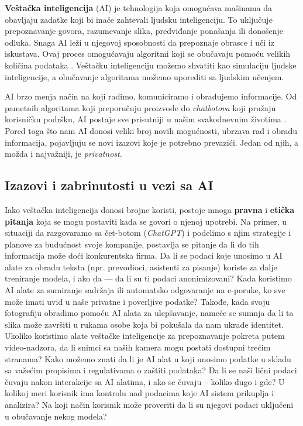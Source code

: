\documentclass[a4paper,12pt]{article}
\begin{document}
\textbf{Veštačka inteligencija} (AI) je tehnologija koja omogućava mašinama da obavljaju zadatke koji bi inače zahtevali ljudsku inteligenciju. To uključuje prepoznavanje govora, razumevanje slika, predviđanje ponašanja ili donošenje odluka. Snaga AI leži u njegovoj sposobnosti da prepoznaje obrasce i uči iz iskustava. Ovaj proces omogućavaju algoritmi koji se obučavaju pomoću velikih količina podataka \cite{whitevision_ai_privacy}. Veštačku inteligenciju možemo shvatiti kao simulaciju ljudske inteligencije, a obučavanje algoritama možemo uporediti sa ljudskim učenjem.

AI brzo menja način na koji radimo, komuniciramo i obrađujemo informacije. Od pametnih algoritama koji preporučuju proizvode do \textit{chatbotova} koji pružaju korisničku podršku, AI postaje sve prisutniji u našim svakodnevnim životima \cite{whitevision_ai_privacy}. Pored toga što nam AI donosi veliki broj novih mogućnosti, ubrzava rad i obradu informacija, pojavljuju se novi izazovi koje je potrebno prevazići. Jedan od njih, a možda i najvažniji, je \textit{privatnost}.

\subsection{Izazovi i zabrinutosti u vezi sa AI}


Iako veštačka inteligencija donosi brojne koristi, postoje mnoga \textbf{pravna} i \textbf{etička pitanja} koja se mogu postaviti kada se govori o njenoj upotrebi. Na primer, u situaciji da razgovaramo sa čet-botom (\textit{ChatGPT}) i podelimo s njim strategije i planove za budućnost svoje kompanije, postavlja se pitanje da li do tih informacija može doći konkurentska firma. Da li se podaci koje unosimo u AI alate za obradu teksta (npr. prevodioci, asistenti za pisanje) koriste za dalje treniranje modela, i ako da — da li su ti podaci anonimizovani? Kada koristimo AI alate za sumiranje sadržaja ili automatsko odgovaranje na e-poruke, ko sve može imati uvid u naše privatne i poverljive podatke? Takođe, kada svoju fotografiju obradimo pomoću AI alata za ulepšavanje, nameće se sumnja da li ta slika može završiti u rukama osobe koja bi pokušala da nam ukrade identitet. Ukoliko koristimo alate veštačke inteligencije za prepoznavanje pokreta putem video-nadzora, da li snimci sa naših kamera mogu postati dostupni trećim stranama? Kako možemo znati da li je AI alat u koji unosimo podatke u skladu sa važećim propisima i regulativama o zaštiti podataka? Da li se naši lični podaci čuvaju nakon interakcije sa AI alatima, i ako se čuvaju – koliko dugo i gde? U kolikoj meri korisnik ima kontrolu nad podacima koje AI sistem prikuplja i analizira? Na koji način korisnik može proveriti da li su njegovi podaci uključeni u obučavanje nekog modela?
\end{document}
